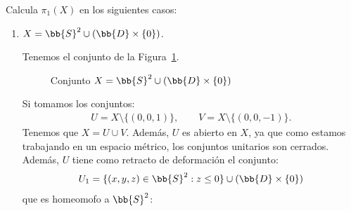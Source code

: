 \begin{ejercicio}
    Calcula $\pi_1(X)$ en los siguientes casos:
    \begin{enumerate}[label=\alph*)]
        \item $X=\bb{S}^2 \cup (\bb{D}\times \{0\})$.

            Tenemos el conjunto de la Figura~\ref{fig:conjuntoX_A}.
            \begin{figure}[h]
                \centering
                \caption{Conjunto $X=\bb{S}^2 \cup (\bb{D}\times \{0\})$}
                \label{fig:conjuntoX_A}
            \end{figure}

            Si tomamos los conjuntos:
            \begin{align*}
                U = X\setminus \{(0,0,1)\},\qquad
                V = X\setminus \{(0,0,-1)\}.
            \end{align*}
            Tenemos que $X=U\cup V$. Además, $U$ es abierto en $X$,  ya que como estamos trabajando en un espacio métrico, los conjuntos unitarios son cerrados. Además, $U$ tiene como retracto de deformación el conjunto:
            \begin{equation*}
                U_1 = \{(x,y,z)\in \bb{S}^2 : z\leq 0\} \cup (\bb{D}\times \{0\})
            \end{equation*}
            que es homeomofo a $\bb{S}^2$:
            \begin{figure}[H]
                \centering
\end{figure}
\end{enumerate}
\end{ejercicio}
